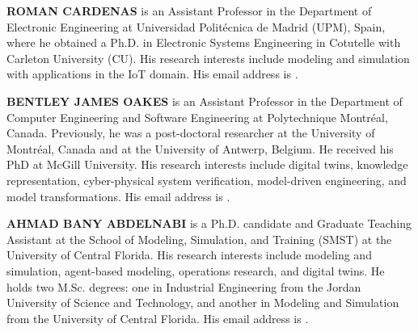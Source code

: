 \documentclass{scspaperproc}
\theoremstyle{scsthe}
\begin{document}
\textbf{\uppercase{Roman Cardenas}} is an Assistant Professor in the Department of Electronic Engineering at Universidad Politécnica de Madrid (UPM), Spain, where he obtained a Ph.D. in Electronic Systems Engineering
in Cotutelle with Carleton University (CU). His research interests include modeling and simulation with
applications in the IoT domain. His email address is .

\textbf{\uppercase{Bentley James Oakes}} is an Assistant Professor in the Department of Computer Engineering and Software Engineering at Polytechnique Montr\'{e}al, Canada. Previously, he was a post-doctoral researcher at the University of Montr\'{e}al, Canada and at the University of Antwerp, Belgium. He received his PhD at McGill University. His research interests include digital twins, knowledge representation, cyber-physical system verification, model-driven engineering, and model transformations. His email address is .

\textbf{\uppercase{Ahmad Bany Abdelnabi}} is a Ph.D. candidate and Graduate Teaching Assistant at the School of Modeling, Simulation, and Training (SMST) at the University of Central Florida. His research interests include modeling and simulation, agent-based modeling, operations research, and digital twins. He holds two M.Sc. degrees: one in Industrial Engineering from the Jordan University of Science and Technology, and another in Modeling and Simulation from the University of Central Florida. His email address is .
\end{document}
